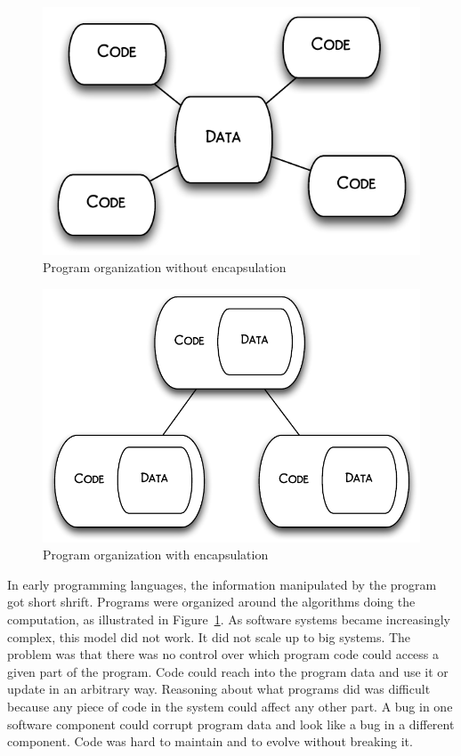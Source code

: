 \documentclass{article}
\begin{document}
\begin{figure}[b]
\begin{center}
\includegraphics[scale=0.8]{pre-OO}
\end{center}
\caption{Program organization without encapsulation}
\label{pre-OO}
\end{figure}

\begin{figure}
\begin{center}
\includegraphics[scale=0.75]{encapsulation}
\end{center}
\caption{Program organization with encapsulation}
\label{encapsulation}
\end{figure}

In early programming languages, the information manipulated by the
program got short shrift. Programs were organized around the
algorithms doing the computation, as illustrated in
Figure~\ref{pre-OO}.  As software systems became
increasingly complex, this model did not work. It did not scale up
to big systems. The problem was that there was no control over
which program code could access a given part of the program. Code
could reach into the program data and use it or update in an arbitrary
way. Reasoning about what programs did was difficult because any
piece of code in the system could affect any other part. A bug in one
software component could corrupt program data and look like a bug in
a different component. Code was hard to maintain and to evolve without
breaking it.
\end{document}
